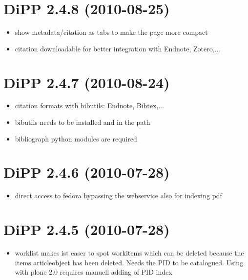 \documentclass[a4paper,10pt,ngerman]{sphinxmanual}
\begin{document}
\section{DiPP 2.4.8 (2010-08-25)}
\label{changelog:dipp-2-4-8-2010-08-25}\begin{itemize}
\item {} 
show metadata/citation as tabs to make the page more compact

\item {} 
citation downloadable for better integration with Endnote, Zotero,...

\end{itemize}


\section{DiPP 2.4.7 (2010-08-24)}
\label{changelog:dipp-2-4-7-2010-08-24}\begin{itemize}
\item {} 
citation formats with bibutils: Endnote, Bibtex,...

\item {} 
bibutils needs to be installed and in the path

\item {} 
bibliograph python modules are required

\end{itemize}


\section{DiPP 2.4.6 (2010-07-28)}
\label{changelog:dipp-2-4-6-2010-07-28}\begin{itemize}
\item {} 
direct access to fedora bypassing the webservice also for indexing pdf

\end{itemize}


\section{DiPP 2.4.5 (2010-07-28)}
\label{changelog:dipp-2-4-5-2010-07-28}\begin{itemize}
\item {} 
worklist makes ist easer to spot workitems which can be deleted because the
items articleobject has been deleted. Needs the PID to be catalogued. Using
with plone 2.0 requires manuell adding of PID index

\end{itemize}
\end{document}
